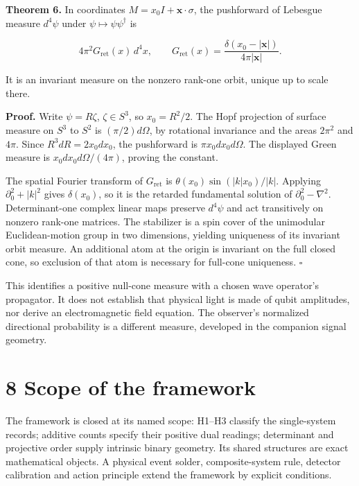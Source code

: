 \documentclass[
  11pt,
  a4paper,
]{article}
\begin{document}
\textbf{Theorem 6.} In coordinates \(M=x_0I+\mathbf x\cdot\sigma\), the pushforward of Lebesgue measure \(d^4\psi\) under \(\psi\mapsto\psi\psi^\dagger\) is

\[4\pi^2G_{\mathrm{ret}}(x)\,d^4x,\qquad
G_{\mathrm{ret}}(x)=\frac{\delta(x_0-|\mathbf x|)}{4\pi|\mathbf x|}.\]

It is an invariant measure on the nonzero rank-one orbit, unique up to scale there.

\textbf{Proof.} Write \(\psi=R\zeta\), \(\zeta\in S^3\), so \(x_0=R^2/2\). The Hopf projection of surface measure on \(S^3\) to \(S^2\) is \((\pi/2)d\Omega\), by rotational invariance and the areas \(2\pi^2\) and \(4\pi\). Since \(R^3dR=2x_0dx_0\), the pushforward is \(\pi x_0dx_0d\Omega\). The displayed Green measure is \(x_0dx_0d\Omega/(4\pi)\), proving the constant.

The spatial Fourier transform of \(G_{\mathrm{ret}}\) is \(\theta(x_0)\sin(|k|x_0)/|k|\). Applying \(\partial_0^2+|k|^2\) gives \(\delta(x_0)\), so it is the retarded fundamental solution of \(\partial_0^2-\nabla^2\). Determinant-one complex linear maps preserve \(d^4\psi\) and act transitively on nonzero rank-one matrices. The stabilizer is a spin cover of the unimodular Euclidean-motion group in two dimensions, yielding uniqueness of its invariant orbit measure. An additional atom at the origin is invariant on the full closed cone, so exclusion of that atom is necessary for full-cone uniqueness. \(\square\)

This identifies a positive null-cone measure with a chosen wave operator's propagator. It does not establish that physical light is made of qubit amplitudes, nor derive an electromagnetic field equation. The observer's normalized directional probability is a different measure, developed in the companion signal geometry.

\section{8 Scope of the framework}\label{scope-of-the-framework}

The framework is closed at its named scope: H1--H3 classify the single-system records; additive counts specify their positive dual readings; determinant and projective order supply intrinsic binary geometry. Its shared structures are exact mathematical objects. A physical event solder, composite-system rule, detector calibration and action principle extend the framework by explicit conditions.
\end{document}
